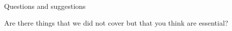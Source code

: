 \documentclass[final,aspectratio=43]{beamer}
\begin{document}
\begin{frame}{Questions and suggestions}

Are there things that we did not cover but that you think are essential?

\end{frame}


%
%
%
\end{document}
